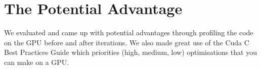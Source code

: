 \section{The Potential Advantage}
We evaluated and came up with potential advantages through profiling the code on the GPU before and after iterations.
We also made great use of the Cuda C Best Practices Guide\cite{best_practices} which priorities (high, medium, low) optimisations that you can make on a GPU.